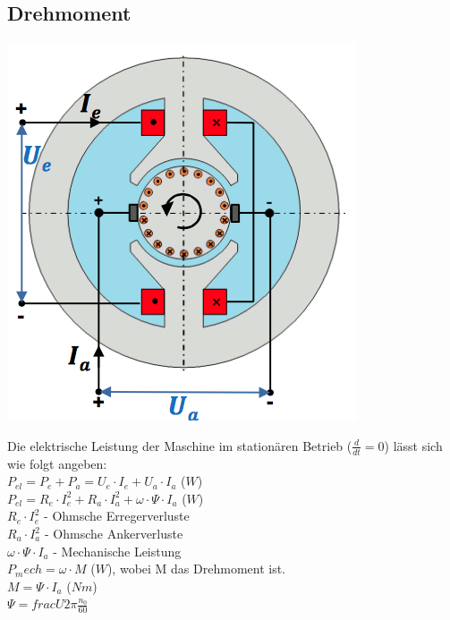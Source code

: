 \subsection{Drehmoment}
\begin{minipage}{0.4 \linewidth}
\includegraphics[width = \linewidth]{./Pics/VL45/GSMErsatzschaltbild}
\end{minipage}
\begin{minipage}{0.6 \linewidth}
Die elektrische Leistung der Maschine im stationären Betrieb ($\frac{d}{dt} = 0$) lässt sich wie folgt angeben: \\

$P_{el} = P_e + P_a = U_e \cdot I_e + U_a \cdot I_a$ ($W$) \\

$P_{el} = R_e \cdot I_e^2 + R_a \cdot I_a^2 + \omega \cdot \Psi \cdot I_a$ ($W$) \\

$R_e \cdot I_e^2$  - Ohmsche Erregerverluste \\

$R_a \cdot I_a^2$  - Ohmsche Ankerverluste \\

$\omega \cdot \Psi \cdot I_a$ -  Mechanische Leistung \\

$P_mech = \omega \cdot M$ ($W$), wobei M das Drehmoment ist. \\

$M = \Psi \cdot I_a$ ($Nm$) \\

$\Psi = frac{U}{2 \pi \frac{n_0}{60}} $ 
\end{minipage}

